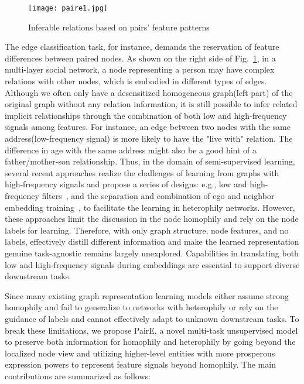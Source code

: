 \documentclass[10pt,journal,compsoc]{IEEEtran}
\begin{document}
\begin{figure}
  \centering
  \centerline{\texttt{[image: paire1.jpg]}}
\caption{Inferable relations based on pairs' feature patterns}
  \label{fig:view}
\end{figure}





The edge classification task, for instance, demands the reservation of feature differences between paired nodes. As shown on the right side of Fig.~\ref{fig:view}, in a multi-layer social network, a node representing a person may have complex relations with other nodes, which is embodied in different types of edges. Although we often only have a desensitized homogeneous graph(left part) of the original graph without any relation information, it is still possible to infer related implicit relationships through the combination of both low and high-frequency signals among features. For instance, an edge between two nodes with the same address(low-frequency signal) is more likely to have the "live with" relation. The difference in age with the same address might also be a good hint of a father/mother-son relationship. Thus, in the domain of semi-supervised learning, several recent approaches \cite{abu2019mixhop,Hou20Measuring} realize the challenges of learning from graphs with high-frequency signals and propose a series of designs: e.g., low and high-frequency filters~\cite{Zhu21,bo21}, and the separation and combination of ego and neighbor embedding training~\cite{Zhu2020}, to facilitate the learning in heterophily networks. However, these approaches limit the discussion in the node homophily and rely on the node labels for learning. Therefore, with only graph structure, node features, and no labels, effectively distill different information and make the learned representation genuine task-agnostic remains largely unexplored. Capabilities in translating both low and high-frequency signals during embeddings are essential to support diverse downstream tasks.



Since many existing graph representation learning models either assume strong homophily and fail to generalize to networks with heterophily or rely on the guidance of labels and cannot effectively adapt to unknown downstream tasks. To break these limitations, we propose PairE, a novel multi-task unsupervised model to preserve both information for homophily and heterophily by going beyond the localized node view and utilizing higher-level entities with more prosperous expression powers to represent feature signals beyond homophily. The main contributions are summarized as follows:
\end{document}
